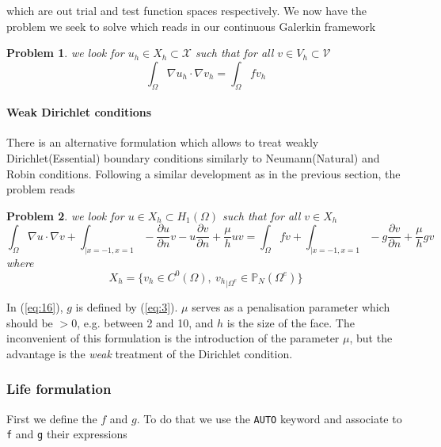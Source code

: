 \documentclass[a4paper]{book}
\newtheorem{problem}{Problem}
\begin{document}
which are out trial and test function spaces respectively.  We now
have the problem we seek to solve which reads in our continuous
Galerkin framework
\begin{problem}
  \label{prob:2}
  we look for $u_h \in X_h \subset \mathcal{X}$ such that for all $v
  \in V_h \subset \mathcal{V}$
  \begin{equation}
    \label{eq:20}
    \int_\Omega \nabla u_h \cdot \nabla v_h  = \int_\Omega f v_h
  \end{equation}
\end{problem}

\paragraph{Weak Dirichlet conditions}
\label{sec:weak-dirichl-cond}

There is an alternative formulation which allows to treat weakly
Dirichlet(Essential) boundary conditions similarly to Neumann(Natural)
and Robin conditions. Following a similar development as in the previous section, the problem reads
\begin{problem}
  \label{prob:3}
  we look for $u \in X_h \subset H_1(\Omega)$ such that for all $v \in
  X_h$
\begin{equation}
  \label{eq:16}
  \int_\Omega \nabla u \cdot \nabla v +
  \int_{|x=-1,x=1} -\frac{\partial u}{\partial n} v - u \frac{\partial v}{\partial n} + \frac{\mu}{h} u v
  =
  \int_\Omega f v +
  \int_{|x=-1,x=1}  - g \frac{\partial v}{\partial n} + \frac{\mu}{h} g v
\end{equation}
where
\begin{equation}
  \label{eq:19}
  X_h = \Big\{ v_h \in C^0(\Omega),\ {v_h}_{|\Omega^e} \in \mathbb{P}_N( \Omega^e ) \Big\}
\end{equation}
\end{problem}
In (\ref{eq:16}), $g$ is defined by (\ref{eq:3}). $\mu$ serves as a penalisation
parameter which should be $> 0$, e.g. between 2 and 10, and $h$ is the
size of the face. The inconvenient of this formulation is the
introduction of the parameter $\mu$, but the advantage is the
\emph{weak} treatment of the Dirichlet condition.

\subsubsection{Life formulation}
\label{sec:life-formulation-1}

First we define the $f$ and $g$. To do that we use the
\lstinline!AUTO! keyword and associate to \lstinline!f! and
\lstinline!g! their expressions
\end{document}
